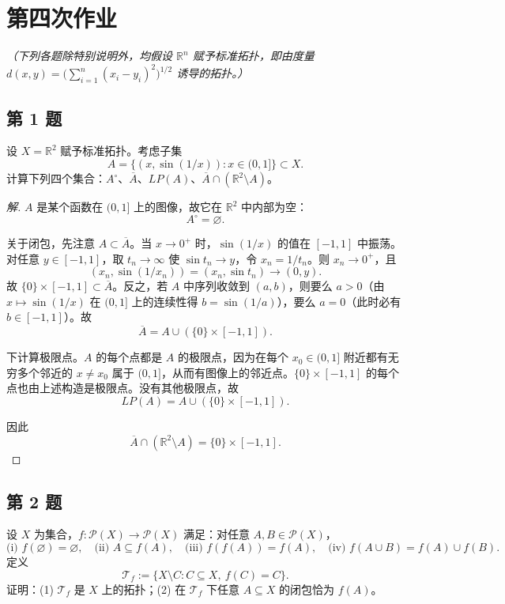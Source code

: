 \documentclass[11pt,a4paper]{article}
\newcommand{\R}{\mathbb{R}}
\theoremstyle{definition}
\newenvironment{solution}{\begin{proof}[解]}{\end{proof}}
\begin{document}
\section{第四次作业}

\textit{（下列各题除特别说明外，均假设 $\R^n$ 赋予标准拓扑，即由度量 $d(x,y)=\bigl(\sum_{i=1}^{n}(x_i-y_i)^2\bigr)^{1/2}$ 诱导的拓扑。）}

\subsection{第 1 题}

设 $X = \R^2$ 赋予标准拓扑。考虑子集
\[
  A = \{(x,\sin(1/x)) : x \in (0,1]\} \subset X.
\]
计算下列四个集合：$A^\circ$、$\overline{A}$、$LP(A)$、$\overline{A} \cap (\R^2 \setminus A)$。

\begin{solution}
$A$ 是某个函数在 $(0,1]$ 上的图像，故它在 $\R^2$ 中内部为空：
\[
  A^\circ = \varnothing.
\]

关于闭包，先注意 $A \subset \overline{A}$。当 $x \to 0^+$ 时，$\sin(1/x)$ 的值在 $[-1,1]$ 中振荡。对任意 $y \in [-1,1]$，取 $t_n \to \infty$ 使 $\sin t_n \to y$，令 $x_n = 1/t_n$。则 $x_n \to 0^+$，且
\[
  (x_n,\sin(1/x_n)) = (x_n,\sin t_n) \to (0,y).
\]
故 $\{0\}\times[-1,1] \subset \overline{A}$。反之，若 $A$ 中序列收敛到 $(a,b)$，则要么 $a>0$（由 $x \mapsto \sin(1/x)$ 在 $(0,1]$ 上的连续性得 $b = \sin(1/a)$），要么 $a=0$（此时必有 $b \in [-1,1]$）。故
\[
  \overline{A} = A \cup (\{0\}\times[-1,1]).
\]

下计算极限点。$A$ 的每个点都是 $A$ 的极限点，因为在每个 $x_0 \in (0,1]$ 附近都有无穷多个邻近的 $x \ne x_0$ 属于 $(0,1]$，从而有图像上的邻近点。$\{0\}\times[-1,1]$ 的每个点也由上述构造是极限点。没有其他极限点，故
\[
  LP(A) = A \cup (\{0\}\times[-1,1]).
\]

因此
\[
  \overline{A} \cap (\R^2 \setminus A) = \{0\}\times[-1,1].
\]
\end{solution}

\subsection{第 2 题}

设 $X$ 为集合，$f : \mathcal{P}(X) \to \mathcal{P}(X)$ 满足：对任意 $A, B \in \mathcal{P}(X)$，
\[
  \text{(i) } f(\varnothing) = \varnothing,\quad
  \text{(ii) } A \subseteq f(A),\quad
  \text{(iii) } f(f(A)) = f(A),\quad
  \text{(iv) } f(A \cup B) = f(A) \cup f(B).
\]
定义
\[
  \mathcal{T}_f := \{X \setminus C : C \subseteq X,\ f(C) = C\}.
\]
证明：(1) $\mathcal{T}_f$ 是 $X$ 上的拓扑；(2) 在 $\mathcal{T}_f$ 下任意 $A \subseteq X$ 的闭包恰为 $f(A)$。
\end{document}
